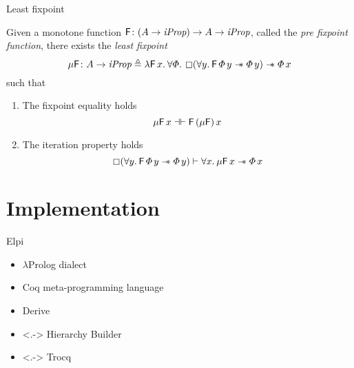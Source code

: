 \documentclass[aspectratio=169]{beamer}
\begin{document}
\begin{frame}{Least fixpoint}
    \begin{theorem}
        Given a monotone function $\textsf{\upshape F}\colon (A \to \textit{iProp}) \to  A \to \textit{iProp}$, called the \emph{pre fixpoint function}, there exists the \emph{least fixpoint}
        \[\lfp\hopred\colon  A \to \iProp \eqdef \Lam \hopred\, \var. \All \pred. \always(\All \varB. \hopred\, \pred\, \varB \wand \pred\, \varB) \wand \pred \, \var\]
        such that
        \begin{enumerate}
            \item The fixpoint equality holds
                  \[ \mu\textsf{\upshape F}\, x \mathrel{\dashv\vdash} \textsf{\upshape F}\, (\mu\textsf{\upshape F})\, x \]
            \item The iteration property holds
                  \[ \always (\All \varB. \hopred\, \pred\, \varB \wand \pred\, \varB) \proves \All \var. \lfp\hopred\, \var \wand \pred\, \var \]
        \end{enumerate}
    \end{theorem}
\end{frame}

\section{Implementation}

\begin{frame}{Elpi}
    \begin{itemize}
        \item<+-> $\lambda$Prolog dialect \parencite{dunchevELPIFastEmbeddable2015}
        \item<+-> Coq meta-programming language \parencite{tassiElpiExtensionLanguage2018}
        \item<+-> Derive \parencite{tassiDerivingProvedEquality2019}
        \item<.-> Hierarchy Builder \parencite{cohenHierarchyBuilderAlgebraic2020}
        \item<.-> Trocq \parencite{cohenTrocqProofTransfer2024}
    \end{itemize}
\end{frame}
\end{document}
